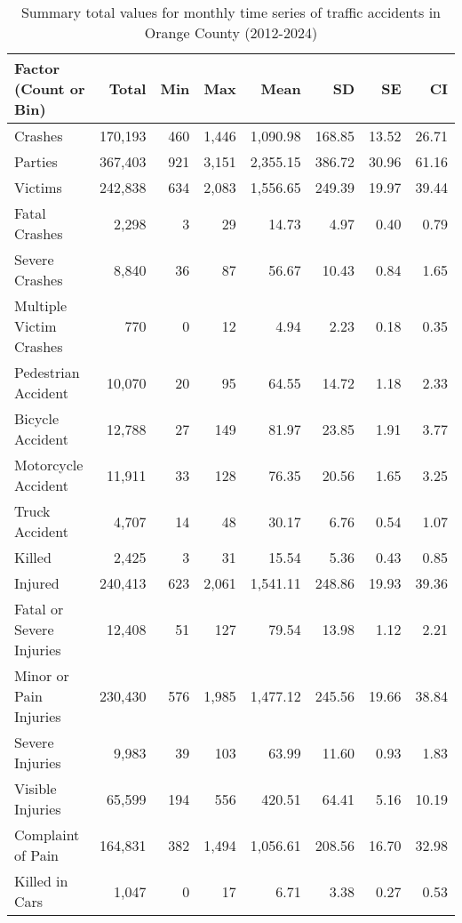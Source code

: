 \begin{table}[h]
\centering
\caption{Summary total values for monthly time series of traffic accidents in Orange County (2012-2024)} 
\label{Tbl3}
\begin{tabular}{lrrrrrrr}
  \toprule
  Factor (Count or Bin) & Total\footnotemark[2] & Min\footnotemark[1] & Max\footnotemark[1] & Mean\footnotemark[1] & SD\footnotemark[1] & SE\footnotemark[1] & CI\footnotemark[1] \\ 
 \midrule
Crashes & 170,193 & 460 & 1,446 & 1,090.98 & 168.85 & 13.52 & 26.71 \\ 
  Parties & 367,403 & 921 & 3,151 & 2,355.15 & 386.72 & 30.96 & 61.16 \\ 
  Victims & 242,838 & 634 & 2,083 & 1,556.65 & 249.39 & 19.97 & 39.44 \\ 
  Fatal Crashes & 2,298 &   3 &  29 & 14.73 & 4.97 & 0.40 & 0.79 \\ 
  Severe Crashes & 8,840 &  36 &  87 & 56.67 & 10.43 & 0.84 & 1.65 \\ 
  Multiple Victim Crashes & 770 &   0 &  12 & 4.94 & 2.23 & 0.18 & 0.35 \\ 
   \midrule 
Pedestrian Accident & 10,070 &  20 &  95 & 64.55 & 14.72 & 1.18 & 2.33 \\ 
  Bicycle Accident & 12,788 &  27 & 149 & 81.97 & 23.85 & 1.91 & 3.77 \\ 
  Motorcycle Accident & 11,911 &  33 & 128 & 76.35 & 20.56 & 1.65 & 3.25 \\ 
  Truck Accident & 4,707 &  14 &  48 & 30.17 & 6.76 & 0.54 & 1.07 \\ 
   \midrule 
Killed & 2,425 &   3 &  31 & 15.54 & 5.36 & 0.43 & 0.85 \\ 
  Injured & 240,413 & 623 & 2,061 & 1,541.11 & 248.86 & 19.93 & 39.36 \\ 
  Fatal or Severe Injuries & 12,408 &  51 & 127 & 79.54 & 13.98 & 1.12 & 2.21 \\ 
  Minor or Pain Injuries & 230,430 & 576 & 1,985 & 1,477.12 & 245.56 & 19.66 & 38.84 \\ 
  Severe Injuries & 9,983 &  39 & 103 & 63.99 & 11.60 & 0.93 & 1.83 \\ 
  Visible Injuries & 65,599 & 194 & 556 & 420.51 & 64.41 & 5.16 & 10.19 \\ 
  Complaint of Pain & 164,831 & 382 & 1,494 & 1,056.61 & 208.56 & 16.70 & 32.98 \\ 
   \midrule 
Killed in Cars & 1,047 &   0 &  17 & 6.71 & 3.38 & 0.27 & 0.53 \\ 

\end{tabular}
\end{table}
